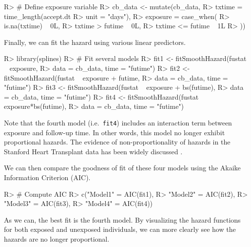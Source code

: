 \documentclass[
]{jss}
\begin{document}
\begin{CodeChunk}

\begin{CodeInput}
R> # Define exposure variable
R> cb_data <- mutate(cb_data,
R>                   txtime = time_length(accept.dt %
R>                                        unit = "days"),
R>                   exposure = case_when(
R>                     is.na(txtime) ~ 0L,
R>                     txtime > futime ~ 0L,
R>                     txtime <= futime ~ 1L
R>                   ))
\end{CodeInput}
\end{CodeChunk}

Finally, we can fit the hazard using various linear predictors.

\begin{CodeChunk}

\begin{CodeInput}
R> library(splines)
R> # Fit several models
R> fit1 <- fitSmoothHazard(fustat ~ exposure,
R>                         data = cb_data, time = "futime")
R> fit2 <- fitSmoothHazard(fustat ~ exposure + futime,
R>                         data = cb_data, time = "futime")
R> fit3 <- fitSmoothHazard(fustat ~ exposure + bs(futime),
R>                         data = cb_data, time = "futime")
R> fit4 <- fitSmoothHazard(fustat ~ exposure*bs(futime),
R>                         data = cb_data, time = "futime")
\end{CodeInput}
\end{CodeChunk}

Note that the fourth model (i.e.~\texttt{fit4}) includes an interaction
term between exposure and follow-up time. In other words, this model no
longer exhibit proportional hazards. The evidence of non-proportionality
of hazards in the Stanford Heart Transplant data has been widely
discussed \citep{arjas1988graphical}.

We can then compare the goodness of fit of these four models using the
Akaike Information Criterion (AIC).

\begin{CodeChunk}

\begin{CodeInput}
R> # Compute AIC
R> c("Model1" = AIC(fit1),
R>   "Model2" = AIC(fit2),
R>   "Model3" = AIC(fit3),
R>   "Model4" = AIC(fit4))
\end{CodeInput}
\end{CodeChunk}

As we can, the best fit is the fourth model. By visualizing the hazard
functions for both exposed and unexposed individuals, we can more
clearly see how the hazards are no longer proportional.
\end{document}
